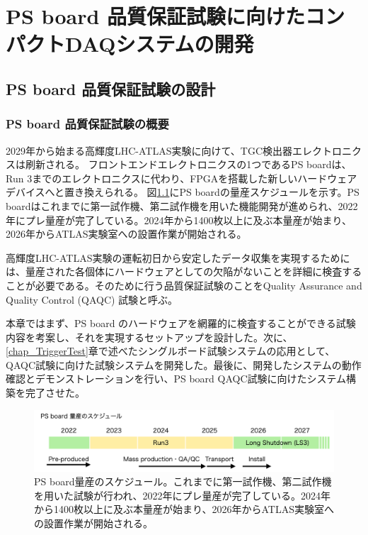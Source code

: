 \chapter{PS board 品質保証試験に向けたコンパクトDAQシステムの開発}
\label{chap_QAQC}

\section{PS board 品質保証試験の設計}
\label{sec_QAQCdesign}
\subsection{PS board 品質保証試験の概要}
\label{subsec_PSBschedule}
2029年から始まる高輝度LHC-ATLAS実験に向けて、TGC検出器エレクトロニクスは刷新される。
フロントエンドエレクトロニクスの1つであるPS boardは、Run 3までのエレクトロニクスに代わり、FPGAを搭載した新しいハードウェアデバイスへと置き換えられる。
図\ref{PSBschedule}にPS boardの量産スケジュールを示す。PS boardはこれまでに第一試作機、第二試作機を用いた機能開発が進められ、2022年にプレ量産が完了している。2024年から1400枚以上に及ぶ本量産が始まり、2026年からATLAS実験室への設置作業が開始される。


高輝度LHC-ATLAS実験の運転初日から安定したデータ収集を実現するためには、量産された各個体にハードウェアとしての欠陥がないことを詳細に検査することが必要である。そのために行う品質保証試験のことをQuality Assurance and Quality Control (QAQC) 試験と呼ぶ。

本章ではまず、PS board のハードウェアを網羅的に検査することができる試験内容を考案し、それを実現するセットアップを設計した。次に、\ref{chap_TriggerTest}章で述べたシングルボード試験システムの応用として、QAQC試験に向けた試験システムを開発した。最後に、開発したシステムの動作確認とデモンストレーションを行い、PS board QAQC試験に向けたシステム構築を完了させた。

\begin{figure} 
\centering
\includegraphics[width=16cm]{fig/QAQC/PSBschedule.png}
\caption[PS board量産のスケジュール]{PS board量産のスケジュール。これまでに第一試作機、第二試作機を用いた試験が行われ、2022年にプレ量産が完了している。2024年から1400枚以上に及ぶ本量産が始まり、2026年からATLAS実験室への設置作業が開始される。}
\label{PSBschedule}
\end{figure}

